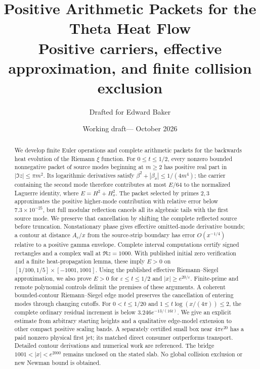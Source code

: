 \documentclass[11pt,letterpaper]{article}
\title{\bfseries Positive Arithmetic Packets for the Theta Heat Flow\\[0.4em]
  \large Positive carriers, effective approximation, and finite collision exclusion}
\author{Drafted for Edward Baker}
\date{Working draft\enspace---\enspace19 October 2026}
\numberwithin{equation}{section}
\theoremstyle{definition}
\theoremstyle{remark}
\begin{document}
\maketitle
\begin{abstract}
We develop finite Euler operations and complete arithmetic packets for
the backwards heat evolution of the Riemann $\xi$ function.
For $0\le t\le1/2$, every nonzero bounded nonnegative packet of source
modes beginning at $m\ge2$ has positive real part in $|\Im z|\le\pi m^2$.
Its logarithmic derivatives satisfy
$\beta^2+|\beta_x|\le1/(4m^4)$; the carrier containing the second mode
therefore contributes at most $E/64$ to the normalized Laguerre identity,
where $E=H^2+H_x^2$. The packet selected by primes $2,3$ approximates
the positive higher-mode contribution with relative error below
$7.3\times10^{-25}$, but full modular reflection cancels all its
algebraic tails with the first source mode.
We preserve that cancellation by shifting the complete reflected source
before truncation. Nonstationary phase gives effective omitted-mode
derivative bounds; a contour at distance $A_c/x$ from the source-strip
boundary has error $O(x^{-1/4})$ relative to a positive gamma envelope.
Complete interval computations certify signed rectangles and a complex
wall at $\Re z=1000$. With published initial zero verification and a
finite heat-propagation lemma, these imply $E>0$ on
$[1/100,1/5]\times[-1001,1001]$.
Using the published effective Riemann--Siegel approximation, we also prove
$E>0$ for $\varepsilon\le t\le1/2$ and $|x|\ge e^{20/\varepsilon}$.
Finite-prime and remote polynomial controls delimit the premises of these
arguments. A coherent bounded-contour Riemann--Siegel edge model preserves
the cancellation of entering modes through changing cutoffs.
For $0<t\le1/20$ and $1\le t\log(x/(4\pi))\le2$, the complete ordinary
residual increment is below $3.246e^{-13/(16t)}$.
We give an explicit estimate from arbitrary starting heights and a
qualitative edge-model extension to other compact positive scaling bands.
A separately certified small box near $4\pi e^{20}$ has a paid nonzero
physical first jet; its matched direct consumer outperforms transport.
Detailed contour derivations and numerical work are referenced.
The bridge $1001<|x|<e^{2000}$ remains unclosed on the stated slab.
No global collision exclusion or new Newman bound is obtained.
\end{abstract}

\clearpage
\tableofcontents
\clearpage













\end{document}

